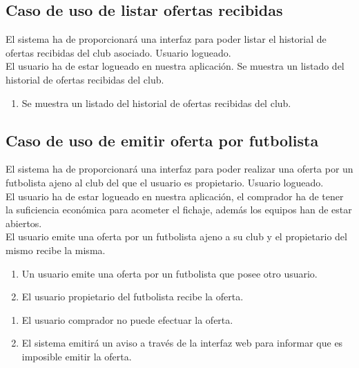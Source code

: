 \subsection{Caso de uso de listar ofertas recibidas}
 El sistema ha de proporcionará una interfaz para poder
listar el historial de ofertas recibidas del club asociado.
 Usuario logueado. \\
 El usuario ha de estar logueado en nuestra aplicación.
 Se muestra un listado del historial de ofertas
recibidas del club.  
\begin{enumerate}
\item Se muestra un listado del historial de ofertas recibidas del club.
\end{enumerate}

\subsection{Caso de uso de emitir oferta por futbolista}
 El sistema ha de proporcionará una interfaz para poder
realizar una oferta por un futbolista ajeno al club del que el usuario es
propietario.
 Usuario logueado. \\
 El usuario ha de estar logueado en nuestra aplicación,
el comprador ha de tener la suficiencia económica
para acometer el fichaje, además los equipos han de estar abiertos. \\
 El usuario emite una oferta por un futbolista ajeno a
su club y el propietario del mismo recibe la misma.  
\begin{enumerate}
\item Un usuario emite una oferta por un futbolista que posee otro usuario.
\item El usuario propietario del futbolista recibe la oferta.
\end{enumerate}
\begin{enumerate}
\item El usuario comprador no puede efectuar la oferta.
\item El sistema emitirá un aviso a través de la interfaz web para informar que
  es imposible emitir la oferta.
\end{enumerate}

